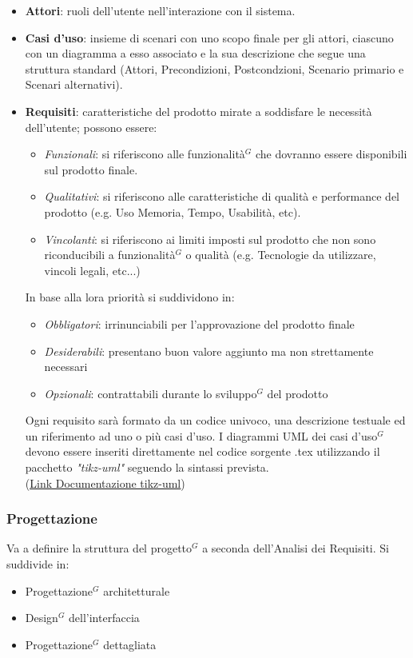 \documentclass[a4paper,10pt]{article}
\begin{document}
\begin{itemize}
  \item \textbf{Attori}: ruoli dell'utente nell'interazione con il sistema.
  \item \textbf{Casi d'uso}: insieme di scenari con uno scopo finale per gli attori, ciascuno con un diagramma a esso 
  associato e la sua descrizione che segue una struttura standard 
  (Attori, Precondizioni, Postcondzioni, Scenario primario e Scenari alternativi).
  \item \textbf{Requisiti}: caratteristiche del prodotto mirate a soddisfare le necessità dell'utente; 
  possono essere:
  \begin{itemize}
    \item \textit{Funzionali}: si riferiscono alle funzionalità$^G$ che dovranno essere disponibili sul prodotto finale.
    \item \textit{Qualitativi}: si riferiscono alle caratteristiche di qualità e performance del prodotto 
    (e.g. Uso Memoria, Tempo, Usabilità, etc).
    \item \textit{Vincolanti}: si riferiscono ai limiti imposti sul prodotto che non sono riconducibili a funzionalità$^G$ o qualità 
    (e.g. Tecnologie da utilizzare, vincoli legali, etc...)
  \end{itemize}
  In base alla lora priorità si suddividono in:
  \begin{itemize}
  \item \textit{Obbligatori}: irrinunciabili per l'approvazione del prodotto finale
  \item \textit{Desiderabili}: presentano buon valore aggiunto ma non strettamente necessari 
  \item \textit{Opzionali}: contrattabili durante lo sviluppo$^G$ del prodotto
  \end{itemize}
  Ogni requisito sarà formato da un codice univoco, una descrizione testuale ed un riferimento ad uno o più casi d'uso.
  I diagrammi UML dei casi d'uso$^G$ devono essere inseriti direttamente nel codice sorgente .tex utilizzando il pacchetto
  \textit{"tikz-uml"} seguendo la sintassi prevista. \\
  (\href{https://perso.ensta.fr/~kielbasi/tikzuml/var/files/doc/tikzumlmanual.pdf}{\underline{Link Documentazione tikz-uml}})

\end{itemize}
\subsubsection{Progettazione}
Va a definire la struttura del progetto$^G$ a seconda dell'Analisi dei Requisiti. Si suddivide in:
\begin{itemize}
  \item Progettazione$^G$ architetturale
  \item Design$^G$ dell'interfaccia
  \item Progettazione$^G$ dettagliata 
\end{itemize}
\end{document}
